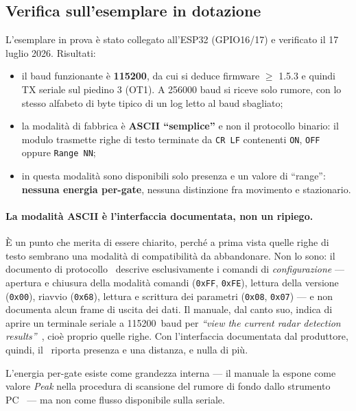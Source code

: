 \subsection{Verifica sull'esemplare in dotazione}

L'esemplare in prova è stato collegato all'ESP32 (GPIO16/17) e verificato il
17 luglio 2026. Risultati:

\begin{itemize}[leftmargin=1.4em,itemsep=2pt]
  \item il baud funzionante è \textbf{115200}, da cui si deduce firmware
        $\geq$ 1.5.3 e quindi TX seriale sul piedino 3 (OT1). A 256000 baud si
        riceve solo rumore, con lo stesso alfabeto di byte tipico di un log letto
        al baud sbagliato;
  \item la modalità di fabbrica è \textbf{ASCII ``semplice''} e non il protocollo
        binario: il modulo trasmette righe di testo terminate da
        \texttt{CR\,LF} contenenti \texttt{ON}, \texttt{OFF} oppure
        \texttt{Range NN};
  \item in questa modalità sono disponibili solo presenza e un valore di
        ``range'': \textbf{nessuna energia per-gate}, nessuna distinzione fra
        movimento e stazionario.
\end{itemize}

\paragraph{La modalità ASCII è l'interfaccia documentata, non un ripiego.} È un
punto che merita di essere chiarito, perché a prima vista quelle righe di testo
sembrano una modalità di compatibilità da abbandonare. Non lo sono: il documento
di protocollo~\cite{hilinkProtoLD2420} descrive esclusivamente i comandi di
\emph{configurazione} --- apertura e chiusura della modalità comandi
(\texttt{0xFF}, \texttt{0xFE}), lettura della versione (\texttt{0x00}), riavvio
(\texttt{0x68}), lettura e scrittura dei parametri (\texttt{0x08},
\texttt{0x07}) --- e non documenta alcun frame di uscita dei dati. Il manuale, dal
canto suo, indica di aprire un terminale seriale a 115200~baud per
\emph{``view the current radar detection results''}~\cite[§4.1]{hilinkManualLD2420},
cioè proprio quelle righe. Con l'interfaccia documentata dal produttore, quindi,
il \ldc\ riporta presenza e una distanza, e nulla di più.

L'energia per-gate esiste come grandezza interna --- il manuale la espone come
valore \emph{Peak} nella procedura di scansione del rumore di fondo dallo
strumento PC~\cite[§4.2.2--4.2.3]{hilinkManualLD2420} --- ma non come flusso
disponibile sulla seriale.

